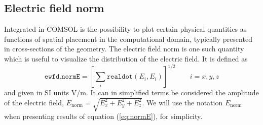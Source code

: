 \subsection{Electric field norm}
Integrated in COMSOL is the possibility to plot certain physical quantities as functions of spatial placement in the computational domain, typically presented in cross-sections of the geometry. The electric field norm is one such quantity which is useful to visualize the distribution of the electric field. It is defined as
\begin{equation}
    \texttt{ewfd.normE} = \left [ \sum_i \texttt{realdot}(E_i,E_i) \right ]^{1/2} \quad\quad i=x,y,z
    \label{eq:normE}
\end{equation}
and given in SI units V$/$m. It can in simplified terms be considered the amplitude of the electric field, $E_\text{norm}=\sqrt{E_x^2+E_y^2+E_z^2}$. We will use the notation $E_\text{norm}$ when presenting results of equation (\ref{eq:normE}), for simplicity.

